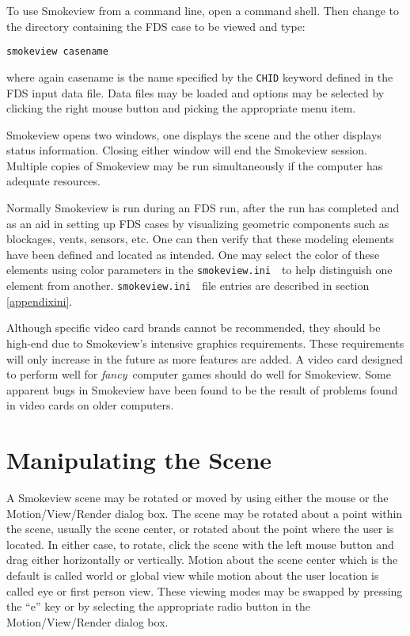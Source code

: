 \documentclass[11pt,twoside]{book}
\newcommand{\svini}{{\tt smokeview.ini}\ }
\begin{document}
To use Smokeview from a command line, open a command shell. Then
change to the directory containing the FDS case to be viewed and
type:
\begin{lstlisting}
smokeview casename
\end{lstlisting}
where again casename is the name specified by the {\tt CHID}
keyword defined in the FDS input data file. Data files may be
loaded and options may be selected by clicking the right mouse
button and picking the appropriate menu item.


Smokeview opens two windows, one displays the scene and the other
displays status information. Closing either window will end the
Smokeview session.  Multiple copies of Smokeview may be run
simultaneously if the computer has adequate resources.

Normally Smokeview is run during an FDS run, after the run has
completed and as an aid in setting up FDS cases by visualizing
geometric components such as blockages, vents, sensors, etc. One
can then verify that these modeling elements have been defined and
located as intended. One may select the color of these elements
using color parameters in the \svini\ to help distinguish one
element from another. \svini\ file entries are described in
section \ref{appendixini}.

Although specific video card brands cannot be recommended, they
should be high-end due to Smokeview's intensive graphics
requirements. These requirements will only increase in the future
as more features are added.  A video card designed to perform well
for {\em fancy}\ computer games should do well for Smokeview. Some
apparent bugs in Smokeview have been found to be the result of
problems found in video cards on older computers.

\section{Manipulating the Scene}

A Smokeview scene may be rotated or moved by using either the mouse or the Motion/View/Render dialog box.
The scene may be rotated about a point within the scene, usually the scene center, or rotated about the point where the user is located.
In either case, to rotate, click the scene with the left mouse button and drag either horizontally or vertically.
Motion about the
scene center which is the default is called world or global view while motion about the
user location is called eye or first person view. These viewing modes
 may be swapped by pressing the ``e'' key or by selecting
the appropriate radio button in the Motion/View/Render
dialog box.
\end{document}
